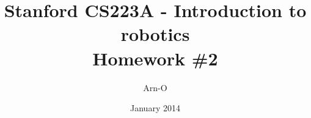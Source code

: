 \documentclass{exam}
\begin{document}
\title{Stanford CS223A - Introduction to robotics \\
  Homework \#2}
\author{Arn-O}
\date{January 2014}
\maketitle

\begin{questions}

\question

\end{questions}
\end{document}
